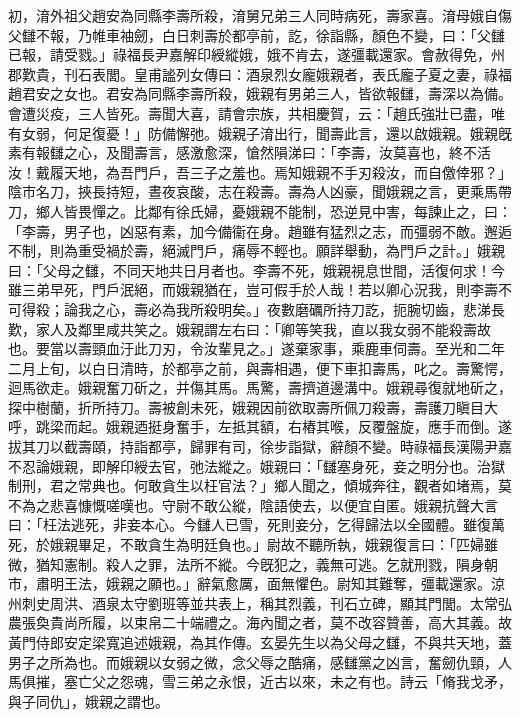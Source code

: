 \begin{pinyinscope}
初，淯外祖父趙安為同縣李壽所殺，淯舅兄弟三人同時病死，壽家喜。淯母娥自傷父讎不報，乃帷車袖劒，白日刺壽於都亭前，訖，徐詣縣，顏色不變，曰：「父讎已報，請受戮。」祿福長尹嘉解印綬縱娥，娥不肯去，遂彊載還家。會赦得免，州郡歎貴，刊石表閭。皇甫謐列女傳曰：酒泉烈女龐娥親者，表氏龐子夏之妻，祿福趙君安之女也。君安為同縣李壽所殺，娥親有男弟三人，皆欲報讎，壽深以為備。會遭災疫，三人皆死。壽聞大喜，請會宗族，共相慶賀，云：「趙氏強壯已盡，唯有女弱，何足復憂！」防備懈弛。娥親子淯出行，聞壽此言，還以啟娥親。娥親旣素有報讎之心，及聞壽言，感激愈深，愴然隕涕曰：「李壽，汝莫喜也，終不活汝！戴履天地，為吾門戶，吾三子之羞也。焉知娥親不手刃殺汝，而自儌倖邪？」陰巿名刀，挾長持短，晝夜哀酸，志在殺壽。壽為人凶豪，聞娥親之言，更乘馬帶刀，鄉人皆畏憚之。比鄰有徐氏婦，憂娥親不能制，恐逆見中害，每諫止之，曰：「李壽，男子也，凶惡有素，加今備衞在身。趙雖有猛烈之志，而彊弱不敵。邂逅不制，則為重受禍於壽，絕滅門戶，痛辱不輕也。願詳舉動，為門戶之計。」娥親曰：「父母之讎，不同天地共日月者也。李壽不死，娥親視息世間，活復何求！今雖三弟早死，門戶泯絕，而娥親猶在，豈可假手於人哉！若以卿心況我，則李壽不可得殺；論我之心，壽必為我所殺明矣。」夜數磨礪所持刀訖，扼腕切齒，悲涕長歎，家人及鄰里咸共笑之。娥親謂左右曰：「卿等笑我，直以我女弱不能殺壽故也。要當以壽頸血汙此刀刃，令汝輩見之。」遂棄家事，乘鹿車伺壽。至光和二年二月上旬，以白日清時，於都亭之前，與壽相遇，便下車扣壽馬，叱之。壽驚愕，迴馬欲走。娥親奮刀斫之，并傷其馬。馬驚，壽擠道邊溝中。娥親尋復就地斫之，探中樹蘭，折所持刀。壽被創未死，娥親因前欲取壽所佩刀殺壽，壽護刀瞋目大呼，跳梁而起。娥親迺挺身奮手，左抵其額，右樁其喉，反覆盤旋，應手而倒。遂拔其刀以截壽頤，持詣都亭，歸罪有司，徐步詣獄，辭顏不變。時祿福長漢陽尹嘉不忍論娥親，即解印綬去官，弛法縱之。娥親曰：「讎塞身死，妾之明分也。治獄制刑，君之常典也。何敢貪生以枉官法？」鄉人聞之，傾城奔往，觀者如堵焉，莫不為之悲喜慷慨嗟嘆也。守尉不敢公縱，陰語使去，以便宜自匿。娥親抗聲大言曰：「枉法逃死，非妾本心。今讎人已雪，死則妾分，乞得歸法以全國體。雖復萬死，於娥親畢足，不敢貪生為明廷負也。」尉故不聽所執，娥親復言曰：「匹婦雖微，猶知憲制。殺人之罪，法所不縱。今旣犯之，義無可逃。乞就刑戮，隕身朝巿，肅明王法，娥親之願也。」辭氣愈厲，面無懼色。尉知其難奪，彊載還家。涼州刺史周洪、酒泉太守劉班等並共表上，稱其烈義，刊石立碑，顯其門閭。太常弘農張奐貴尚所履，以束帛二十端禮之。海內聞之者，莫不改容贊善，高大其義。故黃門侍郎安定梁寬追述娥親，為其作傳。玄晏先生以為父母之讎，不與共天地，蓋男子之所為也。而娥親以女弱之微，念父辱之酷痛，感讎黨之凶言，奮劒仇頸，人馬俱摧，塞亡父之怨魂，雪三弟之永恨，近古以來，未之有也。詩云「脩我戈矛，與子同仇」，娥親之謂也。


\end{pinyinscope}